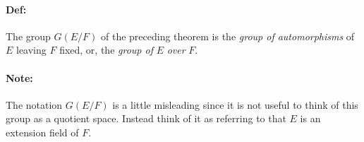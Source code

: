 \documentclass[10pt,a4paper]{article}
\begin{document}
\paragraph{Def:} The group $G(E/F)$ of the preceding theorem is the \textit{group of automorphisms} of $E$ leaving $F$ fixed, or, the \textit{group of} $E$ \textit{over} $F$.

\paragraph{Note:} The notation $G(E/F)$ is a little misleading since it is not useful to think of this group as a quotient space. Instead think of it as referring to that $E$ is an extension field of $F$.
\end{document}
